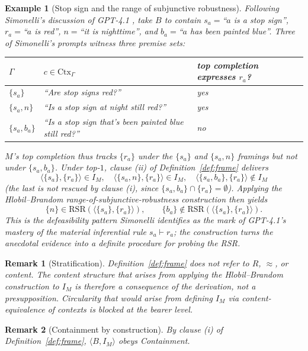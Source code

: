 \documentclass[11pt]{article}
\newtheorem{remark}{Remark}
\newtheorem{example}{Example}
\begin{document}
\begin{example}[Stop sign and the range of subjunctive robustness]
\label{ex:stopsign}
Following Simonelli's discussion of GPT-4.1 \cite{simonelli2026}, take $B$ to contain $s_a = {}$``$a$ is a stop sign'', $r_a = {}$``$a$ is red'', $n = {}$``it is nighttime'', and $b_a = {}$``$a$ has been painted blue''. Three of Simonelli's prompts witness three premise sets:
\begin{center}
\begin{tabular}{lll}
\hline
$\Gamma$ & $c \in \mathrm{Ctx}_\Gamma$ & top completion expresses $r_a$?\\
\hline
$\{s_a\}$ & ``Are stop signs red?'' & yes\\
$\{s_a, n\}$ & ``Is a stop sign at night still red?'' & yes\\
$\{s_a, b_a\}$ & ``Is a stop sign that's been painted blue still red?'' & no\\
\hline
\end{tabular}
\end{center}
$M$'s top completion thus tracks $\{r_a\}$ under the $\{s_a\}$ and $\{s_a, n\}$ framings but not under $\{s_a, b_a\}$. Under top-$1$, clause (ii) of Definition~\ref{def:frame} delivers
\[
\langle\{s_a\}, \{r_a\}\rangle \in I_M, \quad \langle\{s_a, n\}, \{r_a\}\rangle \in I_M, \quad \langle\{s_a, b_a\}, \{r_a\}\rangle \notin I_M
\]
(the last is not rescued by clause (i), since $\{s_a, b_a\} \cap \{r_a\} = \emptyset$). Applying the Hlobil--Brandom range-of-subjunctive-robustness construction \cite[Def.~63]{hlobil2025} then yields
\[
\{n\} \in \mathrm{RSR}(\langle\{s_a\}, \{r_a\}\rangle), \qquad \{b_a\} \notin \mathrm{RSR}(\langle\{s_a\}, \{r_a\}\rangle).
\]
This is the defeasibility pattern Simonelli identifies as the mark of GPT-4.1's mastery of the material inferential rule $s_a \vdash r_a$; the construction turns the anecdotal evidence into a definite procedure for probing the RSR.
\end{example}

\begin{remark}[Stratification]
\label{rem:stratification}
Definition~\ref{def:frame} does not refer to $R$, $\approx$, or content. The content structure that arises from applying the Hlobil--Brandom construction to $I_M$ is therefore a consequence of the derivation, not a presupposition. Circularity that would arise from defining $I_M$ via content-equivalence of contexts is blocked at the bearer level.
\end{remark}

\begin{remark}[Containment by construction]
\label{rem:containment}
By clause (i) of Definition~\ref{def:frame}, $\langle B, I_M \rangle$ obeys Containment.
\end{remark}
\end{document}
